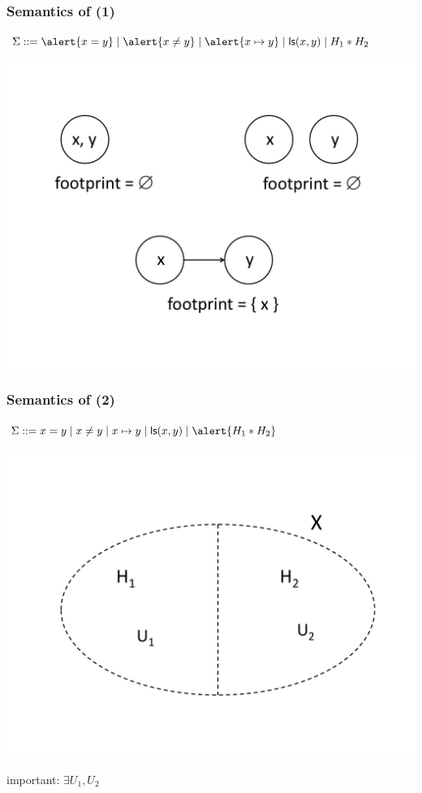 \documentclass{beamer}
\begin{document}
\begin{frame}
  \frametitle{Semantics of \JoshLogic (1)}
  $\Sigma ::= \alert{x = y} \mid \alert{x \neq y} \mid \alert{x \mapsto y} \mid \liste{x}{y} \mid H_1 * H_2$


\begin{center}
\includegraphics[scale=0.4]{resources/sll_1.pdf}
\end{center}

\end{frame}

\begin{frame}
  \frametitle{Semantics of \JoshLogic (2)}
  $\Sigma ::= x = y \mid x \neq y \mid x \mapsto y \mid \liste{x}{y} \mid \alert{H_1 * H_2}$

\begin{center}
\includegraphics[scale=0.3]{resources/sl_star.pdf}
\end{center}

important: $ \exists U_1, U_2 $

\end{frame}
\end{document}
